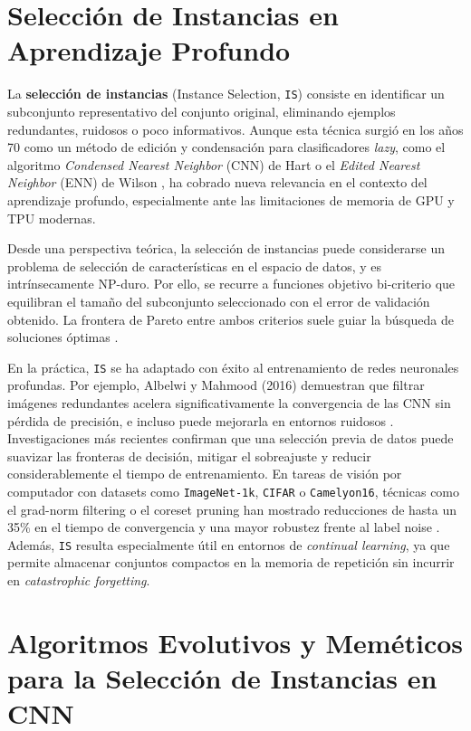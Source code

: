 \section{Selección de Instancias en Aprendizaje Profundo}
La \textbf{selección de instancias} (Instance Selection, \texttt{IS}) consiste en identificar un subconjunto representativo del conjunto original, eliminando ejemplos redundantes, ruidosos o poco informativos.
Aunque esta técnica surgió en los años 70 como un método de edición y condensación para clasificadores \textit{lazy}, como el algoritmo \textit{Condensed Nearest Neighbor} (CNN) de Hart \cite{hartCondensedNearestNeighbor1968} o el \textit{Edited Nearest Neighbor} (ENN) de Wilson \cite{wilsonAsymptoticPropertiesNearest1972}, ha cobrado nueva relevancia en el contexto del aprendizaje profundo, especialmente ante las limitaciones de memoria de GPU y TPU modernas.

Desde una perspectiva teórica, la selección de instancias puede considerarse un problema de selección de características en el espacio de datos, y es intrínsecamente NP-duro.
Por ello, se recurre a funciones objetivo bi-criterio que equilibran el tamaño del subconjunto seleccionado con el error de validación obtenido.
La frontera de Pareto entre ambos criterios suele guiar la búsqueda de soluciones óptimas \cite{derracSurveyEvolutionaryInstance2012}.

En la práctica, \texttt{IS} se ha adaptado con éxito al entrenamiento de redes neuronales profundas.
Por ejemplo, Albelwi y Mahmood (2016) demuestran que filtrar imágenes redundantes acelera significativamente la convergencia de las CNN sin pérdida de precisión, e incluso puede mejorarla en entornos ruidosos \cite{albelwiFrameworkDesigningArchitectures2017}.
Investigaciones más recientes confirman que una selección previa de datos puede suavizar las fronteras de decisión, mitigar el sobreajuste y reducir considerablemente el tiempo de entrenamiento.
En tareas de visión por computador con datasets como \texttt{ImageNet-1k}, \texttt{CIFAR} o \texttt{Camelyon16}, técnicas como el grad-norm filtering o el coreset pruning han mostrado reducciones de hasta un 35\% en el tiempo de convergencia y una mayor robustez frente al label noise \cite{salman2023data, rolnickDeepLearningRobust2018}.
Además, \texttt{IS} resulta especialmente útil en entornos de \textit{continual learning}, ya que permite almacenar conjuntos compactos en la memoria de repetición sin incurrir en \textit{catastrophic forgetting}.


\section{Algoritmos Evolutivos y Meméticos para la Selección de Instancias en CNN}

